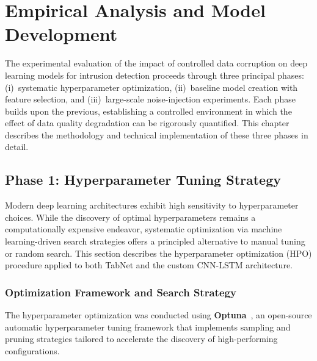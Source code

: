 \documentclass[../main.tex]{subfiles}
\begin{document}
\chapter{Empirical Analysis and Model Development}
\label{chap:5-Empiric-analysis-models}

The experimental evaluation of the impact of controlled data corruption on deep learning models for intrusion detection proceeds through three principal phases: (i)~systematic hyperparameter optimization, (ii)~baseline model creation with feature selection, and (iii)~large-scale noise-injection experiments.  Each phase builds upon the previous, establishing a controlled environment in which the effect of data quality degradation can be rigorously quantified.  This chapter describes the methodology and technical implementation of these three phases in detail.


\newpage
\section{Phase 1: Hyperparameter Tuning Strategy}
\label{sec:hpo-strategy}

Modern deep learning architectures exhibit high sensitivity to hyperparameter choices.  While the discovery of optimal hyperparameters remains a computationally expensive endeavor, systematic optimization via machine learning-driven search strategies offers a principled alternative to manual tuning or random search.  This section describes the hyperparameter optimization (HPO) procedure applied to both TabNet and the custom CNN-LSTM architecture.

\subsection{Optimization Framework and Search Strategy}
\label{sec:hpo-framework}

The hyperparameter optimization was conducted using \textbf{Optuna}~\supercite{akiba2019optuna}, an open-source automatic hyperparameter tuning framework that implements sampling and pruning strategies tailored to accelerate the discovery of high-performing configurations.
\end{document}
